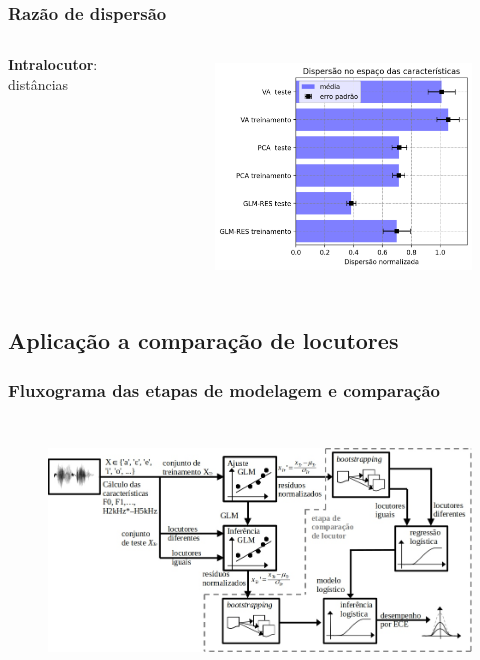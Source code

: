 \documentclass[121pt, aspectratio=169, t]{beamer}
\begin{document}
\begin{frame}[fragile=singleslide]
	\frametitle{Razão de dispersão}
	
	\begin{columns}
		\begin{column}{0.3\textwidth}
			
			\textbf{Intralocutor}: distâncias 
		\end{column}
		\begin{column}{0.7\textwidth}  %
				\begin{figure}
				\centering
				\includegraphics[height=5.9cm]{Dispersao.png}
			\end{figure}			
		\end{column}
		
	\end{columns}


	
\end{frame}



\subsection{Aplicação a comparação de locutores}
\begin{frame}[fragile=singleslide]
	\frametitle{Fluxograma das etapas de modelagem e comparação}
	\vspace{-0.35cm}
	\begin{figure}
		\centering
		\includegraphics[height=7cm]{Fluxograma_v2.jpg}
	\end{figure}
\end{frame}
\end{document}
